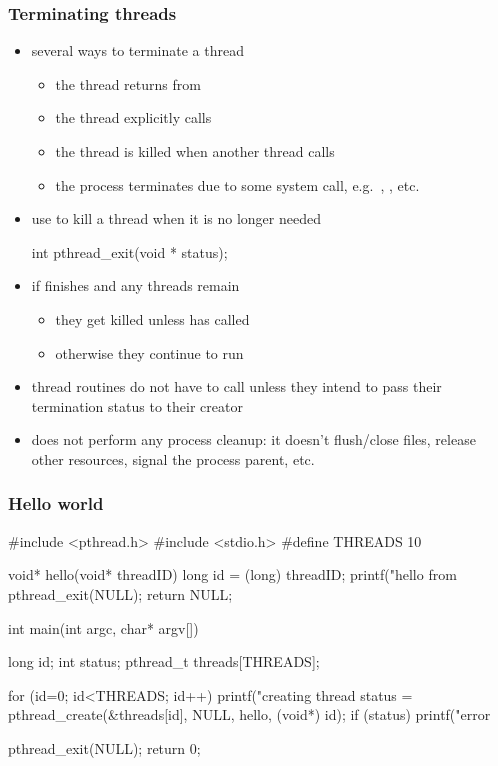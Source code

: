 \begin{frame}[fragile]
%
  \frametitle{Terminating threads}
%
  \begin{itemize}
%
    \item several ways to terminate a thread
      \begin{itemize}
      \item the thread returns from 
      \item the thread explicitly calls 
      \item the thread is killed when another thread calls 
      \item the process terminates due to some system call, e.g.~,
        , etc.
      \end{itemize}
%
  \item use  to kill a thread when it is no longer needed
%
    \begin{C}
int pthread_exit(void * status);
    \end{C}
%
  \item if  finishes and any threads remain
    \begin{itemize}
    \item they get killed unless  has called 
    \item otherwise they continue to run
    \end{itemize}
%
  \item thread routines do not have to call  unless they intend to pass
    their termination status to their creator
%
  \item {} does not perform any process cleanup: it doesn't flush/close
    files, release other resources, signal the process parent, etc.
  \end{itemize}
%
\end{frame}

\begin{frame}[fragile]
%
  \frametitle{Hello world}
  \label{slide:hello-world}
%
  \begin{C}
#include <pthread.h>
#include <stdio.h>
#define THREADS 10

void* hello(void* threadID) {
    long id = (long) threadID;
    printf("hello from %
    pthread_exit(NULL);
    return NULL;
}

int main(int argc, char* argv[]) {
    long id;
    int status;
    pthread_t threads[THREADS];

    for (id=0; id<THREADS; id++) {
        printf("creating thread %
        status = pthread_create(&threads[id], NULL, hello, (void*) id);
        if (status) {
            printf("error %
        }
    }

    pthread_exit(NULL);
    return 0;
}
  \end{C}
%
\end{frame}

